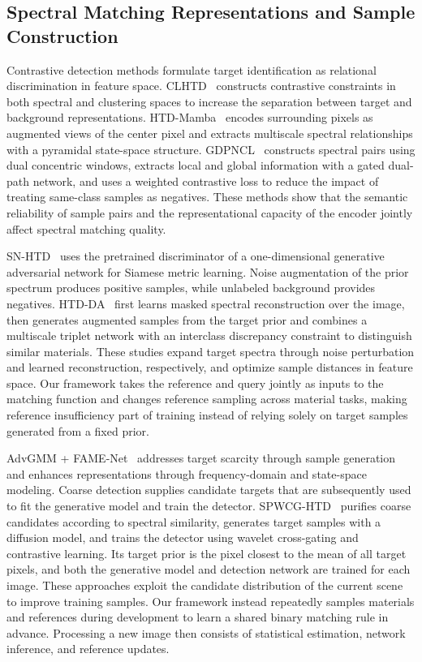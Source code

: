 \documentclass[a4paper,11pt]{article}
\begin{document}
\subsection{Spectral Matching Representations and Sample Construction}
Contrastive detection methods formulate target identification as relational discrimination in feature space. CLHTD~\cite{clhtd} constructs contrastive constraints in both spectral and clustering spaces to increase the separation between target and background representations. HTD-Mamba~\cite{htdmamba} encodes surrounding pixels as augmented views of the center pixel and extracts multiscale spectral relationships with a pyramidal state-space structure. GDPNCL~\cite{gdpncl2025} constructs spectral pairs using dual concentric windows, extracts local and global information with a gated dual-path network, and uses a weighted contrastive loss to reduce the impact of treating same-class samples as negatives. These methods show that the semantic reliability of sample pairs and the representational capacity of the encoder jointly affect spectral matching quality.

SN-HTD~\cite{dsml2025} uses the pretrained discriminator of a one-dimensional generative adversarial network for Siamese metric learning. Noise augmentation of the prior spectrum produces positive samples, while unlabeled background provides negatives. HTD-DA~\cite{htdda2025} first learns masked spectral reconstruction over the image, then generates augmented samples from the target prior and combines a multiscale triplet network with an interclass discrepancy constraint to distinguish similar materials. These studies expand target spectra through noise perturbation and learned reconstruction, respectively, and optimize sample distances in feature space. Our framework takes the reference and query jointly as inputs to the matching function and changes reference sampling across material tasks, making reference insufficiency part of training instead of relying solely on target samples generated from a fixed prior.

AdvGMM + FAME-Net~\cite{fame} addresses target scarcity through sample generation and enhances representations through frequency-domain and state-space modeling. Coarse detection supplies candidate targets that are subsequently used to fit the generative model and train the detector. SPWCG-HTD~\cite{spwcg2026} purifies coarse candidates according to spectral similarity, generates target samples with a diffusion model, and trains the detector using wavelet cross-gating and contrastive learning. Its target prior is the pixel closest to the mean of all target pixels, and both the generative model and detection network are trained for each image. These approaches exploit the candidate distribution of the current scene to improve training samples. Our framework instead repeatedly samples materials and references during development to learn a shared binary matching rule in advance. Processing a new image then consists of statistical estimation, network inference, and reference updates.
\end{document}
